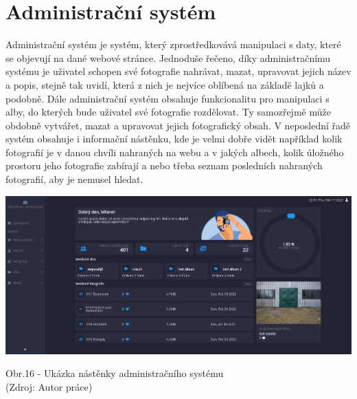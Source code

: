 \documentclass[12pt,a4paper]{report}
\begin{document}
  \chapter{Administrační systém}
 
  Administrační systém je systém, který zprostředkovává manipulaci s daty, které se objevují na
  dané webové stránce. Jednoduše řečeno, díky administračnímu systému je uživatel schopen své
  fotografie nahrávat, mazat, upravovat jejich název a popis, stejně tak uvidí, která z nich je
  nejvíce oblíbená na základě lajků a podobně. Dále administrační systém obsahuje funkcionalitu
  pro manipulaci s alby, do kterých bude uživatel své fotografie rozdělovat. Ty samozřejmě může
  obdobně vytvářet, mazat a upravovat jejich fotografický obsah. V neposlední řadě systém
  obsahuje i informační nástěnku, kde je velmi dobře vidět například kolik fotografií je v danou chvíli
  nahraných na webu a v jakých albech, kolik úložného prostoru jeho fotografie zabírají a nebo
  třeba seznam posledních nahraných fotografií, aby je nemusel hledat.

  \vspace*{0.5cm}
  \noindent\includegraphics[width=\linewidth]{admin.png}
  \begin{center}
    Obr.16 -   Ukázka nástěnky administračního systému \\
    (Zdroj: Autor práce)
  \end{center}
  \vspace*{0.5cm}
\end{document}
